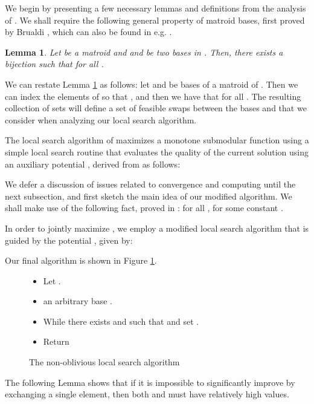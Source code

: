 \documentclass{article}
\newtheorem{lemma}[theorem]{Lemma}
\theoremstyle{definition}
\begin{document}
We begin by presenting a few necessary lemmas and definitions from the analysis of \cite{Filmus2014}.  We shall require the following general property of matroid bases, first proved by Brualdi \cite{Brualdi1969}, which can also be found in e.g. \cite[Corollary 39.12a]{Schrijver2003}.
\begin{lemma}
\label{lem:brualdi}
Let  be a matroid and  and  be two bases in .  Then, there exists a bijection  such that  for all .
\end{lemma}
We can restate Lemma \ref{lem:brualdi} as follows: let  and  be bases of a matroid  of .  Then we can index the elements of  so that , and then we have that  for all .  The resulting collection of sets  will define a set of feasible swaps between the bases  and  that we consider when analyzing our local search algorithm.

The local search algorithm of \cite{Filmus2014} maximizes a monotone submodular function  using a simple local search routine that evaluates the quality of the current solution using an auxiliary potential , derived from  as follows:


We defer a discussion of issues related to convergence and computing  until the next subsection, and first sketch the main idea of our modified algorithm.  We shall make use of the following fact, proved in \cite[Lemma 4.4, p.\ 524-5]{Filmus2014}: for all ,
 for some constant .

In order to jointly maximize , we employ a modified local search algorithm that is guided by the potential , given by:

Our final algorithm is shown in Figure \ref{fig:non-oblv-alg}.

\begin{figure}
\begin{framed}
\begin{itemize}[itemsep=0ex, topsep=0.5ex]
\item Let .
\item  an arbitrary base .
\item  While there exists  and 
such that  and  set .
\item Return 
\end{itemize}
\end{framed}
\caption{The non-oblivious local search algorithm}
\label{fig:non-oblv-alg}
\end{figure}

The following Lemma shows that if it is impossible to significantly improve  by exchanging a single element, then both  and  must have relatively high values.
\end{document}
